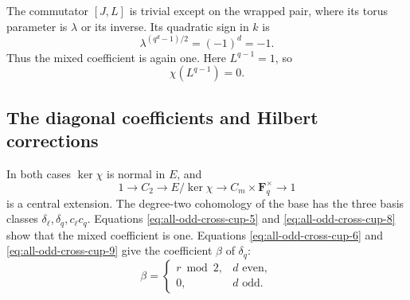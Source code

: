 The commutator \([J,L]\) is trivial except on the
wrapped pair, where its torus parameter is
\(\lambda\) or its inverse.
Its quadratic sign in \(k\) is
\begin{equation}
               \lambda^{(q^d-1)/2}=(-1)^d=-1.             \label{eq:all-odd-cross-cup-8}
\end{equation}
Thus the mixed coefficient is again one.
Here \(L^{q-1}=1\), so
\begin{equation}
                              \chi(L^{q-1})=0.             \label{eq:all-odd-cross-cup-9}
\end{equation}

\subsection{The diagonal coefficients and Hilbert corrections}

In both cases \(\ker\chi\) is normal in \(E\), and
\begin{equation}
 1\to C_2\to E/\ker\chi\to C_m\times\mathbf F_q^\times\to1
                                                               \label{eq:all-odd-cross-cup-10}
\end{equation}
is a central extension.
The degree-two cohomology of the base has the three
basis classes \(\delta_\ell,\delta_q,c_\ell c_q\).
Equations \eqref{eq:all-odd-cross-cup-5} and \eqref{eq:all-odd-cross-cup-8} show that the mixed coefficient
is one. Equations \eqref{eq:all-odd-cross-cup-6} and \eqref{eq:all-odd-cross-cup-9} give the coefficient
\(\beta\) of \(\delta_q\):
\begin{equation}
 \beta=
 \begin{cases}
 r\bmod2,&d\text{ even},\\
 0,&d\text{ odd}.
 \end{cases}                                               \label{eq:all-odd-cross-cup-11}
\end{equation}

